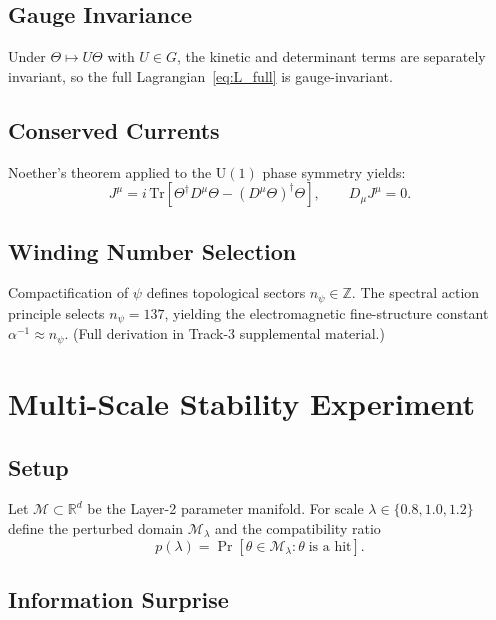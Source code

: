 \documentclass[12pt,a4paper]{article}
\newcommand{\R}{\mathbb{R}}
\newcommand{\Z}{\mathbb{Z}}
\newcommand{\Tr}{\mathrm{Tr}}
\newcommand{\calM}{\mathcal{M}}
\begin{document}
\subsection{Gauge Invariance}

Under $\Theta\mapsto U\Theta$ with $U\in G$, the kinetic and determinant terms are
separately invariant, so the full Lagrangian~\eqref{eq:L_full} is gauge-invariant.

\subsection{Conserved Currents}

Noether's theorem applied to the $\mathrm{U}(1)$ phase symmetry yields:
\begin{equation}
  J^\mu = i\,\Tr[\Theta^\dagger D^\mu\Theta - (D^\mu\Theta)^\dagger\Theta],
  \qquad
  D_\mu J^\mu = 0.
  \label{eq:Noether_J}
\end{equation}

\subsection{Winding Number Selection}

Compactification of $\psi$ defines topological sectors $n_\psi\in\Z$.
The spectral action principle selects $n_\psi = 137$, yielding the
electromagnetic fine-structure constant $\alpha^{-1}\approx n_\psi$.
(Full derivation in Track-3 supplemental material.)

\section{Multi-Scale Stability Experiment}
\label{sec:stability}

\subsection{Setup}

Let $\calM\subset\R^d$ be the Layer-2 parameter manifold.
For scale $\lambda\in\{0.8, 1.0, 1.2\}$ define the perturbed domain
$\calM_\lambda$ and the compatibility ratio
\begin{equation}
  p(\lambda) = \Pr[\theta\in\calM_\lambda : \theta\;\text{is a hit}].
  \label{eq:compat}
\end{equation}

\subsection{Information Surprise}
\end{document}
